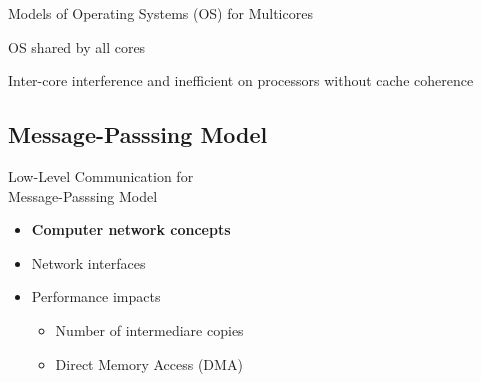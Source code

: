 \begin{frame}{Models of Operating Systems (OS) for Multicores}
\begin{overprint}
{				\begin{center}
					OS shared by all cores
				\end{center}
				\begin{center}
					Inter-core interference and inefficient on processors without cache coherence
				\end{center}
			}
		\end{overprint}

		\end{frame}

	\subsection{Message-Passsing Model}

		\begin{frame}[fragile]{Low-Level Communication for\\Message-Passsing Model}
			\begin{itemize}
				\item \textbf{Computer network concepts}
			\end{itemize}

			\begin{itemize}
				\item Network interfaces
			\end{itemize}

			\begin{itemize}
				\item Performance impacts
				\begin{itemize}
					\item Number of intermediare copies
					\item Direct Memory Access (DMA)
				\end{itemize}
			\end{itemize}

		\end{frame}

